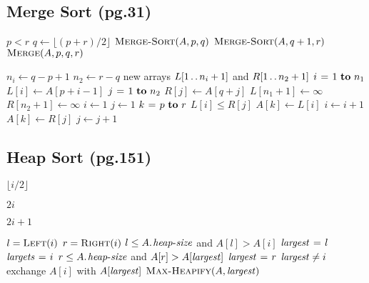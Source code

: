 \documentclass[twocolumn]{article}
\begin{document}
\subsection{Merge Sort (pg.31)}
\begin{codebox}
\li \If $p < r$
\li \Then $q \gets \lfloor (p+r)/2 \rfloor $
\li 		$\textnormal{\scshape Merge-Sort}(A,p,q)$
\li 		$\textnormal{\scshape Merge-Sort}(A,q+1,r)$
\li 		$\textnormal{\scshape Merge}(A,p,q,r)$
	\End
\end{codebox}

\begin{codebox}
\li $n_i \gets q-p+1$
\li $n_2 \gets r-q$
\li new arrays $L[1 \mathinner{\ldotp\ldotp} n_i+1]$ and $R[1 \mathinner{\ldotp\ldotp} n_2+1]$
\li \For $i \gets 1 \To n_1$
\li \Do $L[i] \gets A[p+i-1]$
    \End
\li \For $j \gets 1 \To n_2$
\li \Do $R[j] \gets A[q+j]$
	\End
\li $L[n_1+1] \gets \infty$
\li $R[n_2+1] \gets \infty$
\li $i \gets 1$
\li $j \gets 1$
\li \For $k \gets p \To r$
\li \Do \If $L[i] \le R[j]$
\li 		\Then $A[k] \gets L[i]$
\li 			  $i \gets i+1$
\li 		\Else $A[k] \gets R[j]$
\li 			  $j \gets j+1$
		\End
	\End
\end{codebox}

\subsection{Heap Sort (pg.151)}
\begin{codebox}
\li \Return $\lfloor i/2 \rfloor $
\end{codebox}

\begin{codebox}
\li \Return $2i$
\end{codebox}

\begin{codebox}
\li \Return $2i+1$
\end{codebox}

\begin{codebox}
\li $l = \textnormal{\scshape Left}(i)$
\li $r = \textnormal{\scshape Right}(i)$
\li \If $l \le \attrib{A}{heap-size}$ and $A[l] > A[i]$
\li \Then $\id{largest} \gets l$
\li \Else $\id{largets} \gets i$
	\End
\li \If $r \le \attrib{A}{heap-size}$ and $A[r] > A[\id{largest}]$
\li \Then $\id{largest} \gets r$
	\End
\li \If $\id{largest} \neq i$
\li \Then exchange $A[i]$ with $A[\id{largest}]$
\li 		  $\proc{Max-Heapify}(A,\id{largest})$
	\End
\end{codebox}
\end{document}
